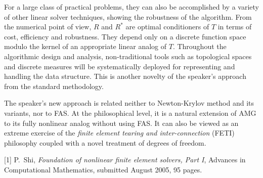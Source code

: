 \documentclass{report}
\begin{document}
For a
large class of practical problems, they can also be
accomplished by a variety of other linear solver techniques,
showing the robustness of the algorithm. From the numerical
point of view, $R$ and $R^*$ are optimal conditioners of $T$
in terms of cost, efficiency and robustness. They depend
only on a discrete function space modulo the kernel of an
appropriate linear analog of $T$. Throughout the algorithmic
design and analysis, non-traditional tools such as
topological spaces and discrete measures will be
systematically deployed for representing and handling the
data structure. This is another novelty of the speaker's
approach from the standard methodology.

The speaker's
new approach is related neither to Newton-Krylov method and
its variants, nor to FAS. At the philosophical level, it is
a natural extension of AMG to its fully nonlinear analog
without using FAS. It can also be viewed as an extreme
exercise of the {\it finite element tearing and
inter-connection} (FETI) philosophy coupled with a novel
treatment of degrees of freedom.

[1]
P.~Shi, {\em Foundation of nonlinear finite element
solvers, Part I}, Advances in Computational Mathematics,
submitted August 2005, 95 pages.


\end{document}
